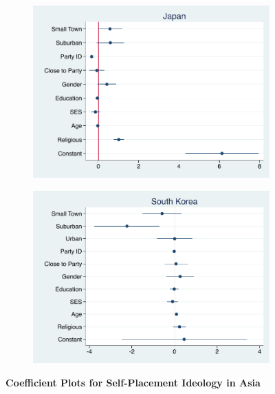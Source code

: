 \documentclass[12pt, titlepage]{article}
\newcommand\tb{\textbf}
\begin{document}
\begin{figure}[H]
	\centering
	\begin{subfigure}[b]{0.475\textwidth}
		\centering
		\includegraphics[width=\textwidth]{IdeologyCoef/Japan}
	\end{subfigure}
	\hfill
	\begin{subfigure}[b]{0.475\textwidth}  
		\centering 
		\includegraphics[width=\textwidth]{IdeologyCoef/SouthKorea}
	\end{subfigure}
	\caption[ \tb{Self-Placement Ideology - Asia} ]
	{\tb {Coefficient Plots for Self-Placement Ideology in Asia} }
	\label{AsiaIdeo}
\end{figure}
\end{document}
